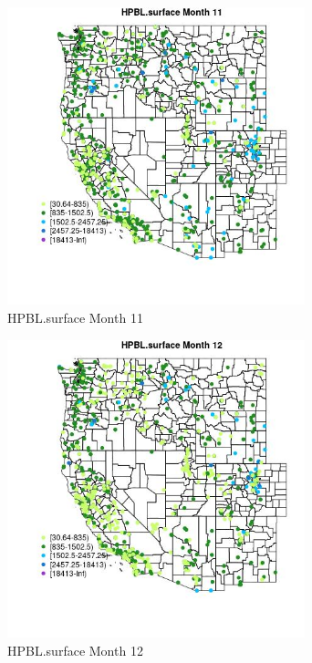 \begin{figure} 
\centering  
\includegraphics[width=0.77\textwidth]{Code_Outputs/Report_ML_input_PM25_Step4_part_f_de_duplicated_aveswNAs_MapObsMo11HPBLsurface.jpg} 
\caption{\label{fig:Report_ML_input_PM25_Step4_part_f_de_duplicated_aveswNAsMapObsMo11HPBLsurface}HPBL.surface Month 11} 
\end{figure} 
 

\begin{figure} 
\centering  
\includegraphics[width=0.77\textwidth]{Code_Outputs/Report_ML_input_PM25_Step4_part_f_de_duplicated_aveswNAs_MapObsMo12HPBLsurface.jpg} 
\caption{\label{fig:Report_ML_input_PM25_Step4_part_f_de_duplicated_aveswNAsMapObsMo12HPBLsurface}HPBL.surface Month 12} 
\end{figure} 
 

